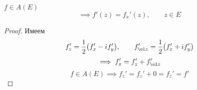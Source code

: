 \begin{implication}
	$ f \in A(E) $
	$$ \implies f'(z) = f_x'(z), \qquad z \in E $$
\end{implication}

\begin{proof}
	Имеем
	$$ f_z' = \frac12 \big( f_x' - if_y' \big), \qquad f_{\ol z}' = \frac12 \big( f_x' + if_y' \big) $$
	$$ \implies f_x' = f_z' + f_{\ol z}' $$
	$$ f \in A(E) \implies f_z' = f_z' + 0 = f_z' = f' $$
\end{proof}
